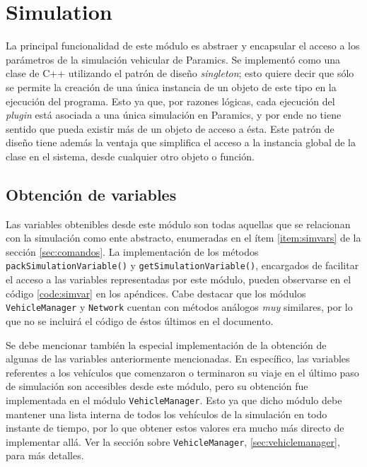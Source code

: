 \section{Simulation}\label{sec:simulation}

La principal funcionalidad de este módulo es abstraer y encapsular el acceso a los parámetros de la simulación vehicular de Paramics. Se implementó como una clase de C++ utilizando el patrón de diseño \emph{singleton}; esto quiere decir que sólo se permite la creación de una única instancia de un objeto de este tipo en la ejecución del programa. Esto ya que, por razones lógicas, cada ejecución del \emph{plugin} está asociada a una única simulación en Paramics, y por ende no tiene sentido que pueda existir más de un objeto de acceso a ésta. Este patrón de diseño tiene además la ventaja que simplifica el acceso a la instancia global de la clase en el sistema, desde cualquier otro objeto o función.

\subsection{Obtención de variables}\label{sec:simulation:vars}

Las variables obtenibles desde este módulo son todas aquellas que se relacionan con la simulación como ente abstracto, enumeradas en el ítem \ref{item:simvars} de la sección \ref{sec:comandos}. La implementación de los métodos \texttt{packSimulationVariable()} y \texttt{getSimulationVariable()}, encargados de facilitar el acceso a las variables representadas por este módulo, pueden observarse en el código \ref{code:simvar} en los apéndices. Cabe destacar que los módulos \texttt{VehicleManager} y \texttt{Network} cuentan con métodos análogos \emph{muy} similares, por lo que no se incluirá el código de éstos últimos en el documento.

Se debe mencionar también la especial implementación de la obtención de algunas de las variables anteriormente mencionadas. En específico, las variables referentes a los vehículos que comenzaron o terminaron su viaje en el último paso de simulación son accesibles desde este módulo, pero su obtención fue implementada en el módulo \texttt{VehicleManager}. Esto ya que dicho módulo debe mantener una lista interna de todos los vehículos de la simulación en todo instante de tiempo, por lo que obtener estos valores era mucho más directo de implementar allá. Ver la sección sobre \texttt{VehicleManager}, \ref{sec:vehiclemanager}, para más detalles.

